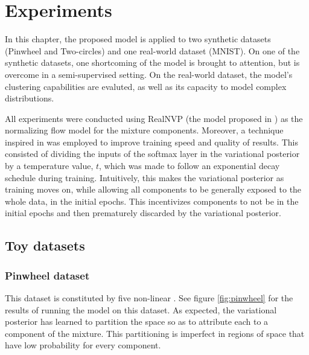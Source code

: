 \chapter{Experiments}
\label{chapter:experiments}

In this chapter, the proposed model is applied to two synthetic datasets (Pinwheel
and Two-circles) and one real-world dataset (MNIST). On one of the synthetic
datasets, one shortcoming of the model is brought to attention, but is overcome
in a semi-supervised setting. On the real-world dataset, the model's clustering
capabilities are evaluted, as well as its capacity to model complex distributions.

All experiments were conducted using RealNVP (the model proposed in \autocite{real-nvp})
as the normalizing flow model for the mixture components. Moreover, a technique
inspired in \autocite{mixae} was employed to improve training speed and quality
of results. This consisted of dividing the inputs of the softmax layer in
the variational posterior by a temperature value, $t$, which was made to follow
an exponential decay schedule during training. Intuitively, this makes the
variational posterior  as training moves on, while allowing all
components to be generally exposed to the whole data, in the initial epochs.
This incentivizes components to not be  in the initial epochs and
then prematurely discarded by the variational posterior.

\section{Toy datasets}
\subsection{Pinwheel dataset}

This dataset is constituted by five non-linear . See figure \ref{fig:pinwheel}
for the results of running the model on this dataset. As expected, the variational
posterior has learned to partition the space so as to attribute each  to
a component of the mixture. This partitioning is imperfect in regions of space
that have low probability for every component.

